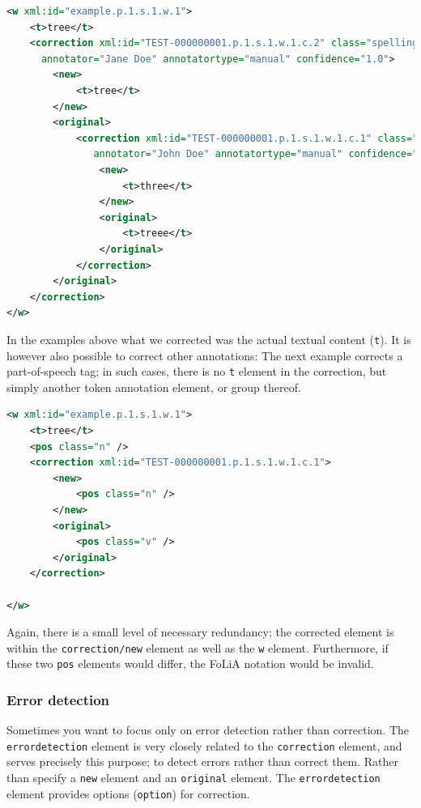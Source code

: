 \documentclass[a4paper,12pt]{report}
\begin{document}
\begin{lstlisting}[language=xml]
<w xml:id="example.p.1.s.1.w.1">
    <t>tree</t>
    <correction xml:id="TEST-000000001.p.1.s.1.w.1.c.2" class="spelling" 
      annotator="Jane Doe" annotatortype="manual" confidence="1.0">
        <new>
            <t>tree</t>
        </new>
        <original>
            <correction xml:id="TEST-000000001.p.1.s.1.w.1.c.1" class="spelling"
               annotator="John Doe" annotatortype="manual" confidence="0.6">
                <new>
                    <t>three</t>
                </new>
                <original>
                    <t>treee</t>
                </original>
            </correction>
        </original>
    </correction>
</w>
\end{lstlisting}

In the examples above what we corrected was the actual textual content (\texttt{t}). It is however also possible to correct other annotations:
The next example corrects a part-of-speech tag; in such cases, there is no \texttt{t} element in the correction, but simply another token annotation element, or group thereof.

\begin{lstlisting}[language=xml]
<w xml:id="example.p.1.s.1.w.1">
    <t>tree</t>
    <pos class="n" />
    <correction xml:id="TEST-000000001.p.1.s.1.w.1.c.1">
        <new>
            <pos class="n" />
        </new>
        <original>
            <pos class="v" />
        </original>
    </correction>
    
</w>    
\end{lstlisting}

Again, there is a small level of necessary redundancy; the corrected element is within the \texttt{correction/new} element as well as the \texttt{w} element. Furthermore, if these two \texttt{pos} elements would differ, the FoLiA notation would be invalid.

\subsubsection{Error detection} 


Sometimes you want to focus only on error detection rather than correction. The \texttt{errordetection} element is very closely related to the \texttt{correction} element, and serves precisely this purpose; to detect errors rather than correct them. Rather than specify a \texttt{new} element and an \texttt{original} element. The \texttt{errordetection} element provides options (\texttt{option}) for correction.
\end{document}
